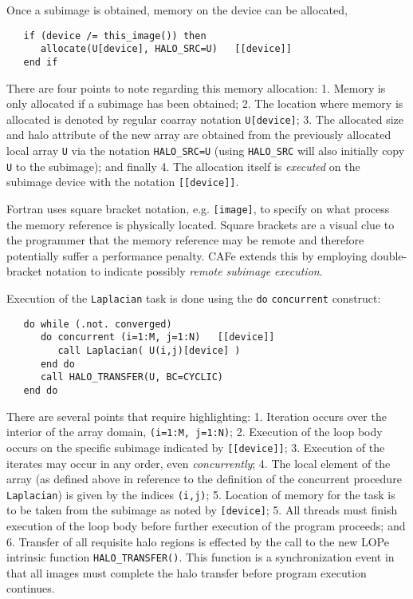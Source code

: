 Once a subimage is obtained, memory on the device can be allocated,
\begin{verbatim}
   if (device /= this_image()) then
      allocate(U[device], HALO_SRC=U)   [[device]]
   end if
\end{verbatim}
There are four points to note regarding this memory allocation: 1. Memory is only allocated if a
subimage has been obtained; 2. The location where memory is allocated is denoted by regular coarray
notation \texttt{U[device]}; 3. The allocated size and halo attribute of the new array are obtained
from the previously allocated local array \texttt{U} via the notation \texttt{HALO\_SRC=U} (using
\texttt{HALO\_SRC} will also initially copy \texttt{U} to the subimage); and finally 4. The
allocation itself is \emph{executed} on the subimage device with the notation \texttt{[[device]]}.

Fortran uses square bracket notation, e.g. \texttt{[image]}, to specify on what process the
memory reference is physically located.  Square brackets are a visual clue to the
programmer that the memory reference may be remote and therefore potentially suffer a
performance penalty.  CAFe extends this by employing double-bracket notation to indicate
possibly \emph{remote subimage execution}.

Execution of the \texttt{Laplacian} task is done using the \texttt{do}
\texttt{concurrent} construct:
\begin{verbatim}
   do while (.not. converged)
      do concurrent (i=1:M, j=1:N)   [[device]]
         call Laplacian( U(i,j)[device] )
      end do
      call HALO_TRANSFER(U, BC=CYCLIC)
   end do
\end{verbatim}
There are several points that require highlighting: 1. Iteration occurs over the interior
of the array domain, \texttt{(i=1:M, j=1:N)}; 2. Execution of the loop body occurs on the
specific subimage indicated by \texttt{[[device]]}; 3. Execution of the iterates may occur
in any order, even \emph{concurrently}; 4. The local element of the array (as
defined above in reference to the definition of the concurrent procedure
\texttt{Laplacian}) is given by the indices \texttt{(i,j)}; 5. Location of memory for the
task is to be taken from the subimage as noted by \texttt{[device]}; 5. All threads must finish
execution of the loop body before further execution of the program proceeds; and 6. Transfer of
all requisite halo regions is effected by the call to the new LOPe intrinsic function
\texttt{HALO\_TRANSFER()}.  This function is a synchronization event in that all images must
complete the halo transfer before program execution continues.

